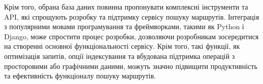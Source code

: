 Крім того, обрана база даних повинна пропонувати комплексні інструменти та API, які спрощують розробку та підтримку сервісу пошуку маршрутів. Інтеграція з популярними мовами програмування та фреймворками, такими як Python і Django, може спростити процес розробки, дозволяючи розробникам зосередитися на створенні основної функціональності сервісу. Крім того, такі функції, як оптимізація запитів, опції індексування та вбудована підтримка операцій з просторовими або графічними даними, можуть значно підвищити продуктивність та ефективність функціоналу пошуку маршрутів.







